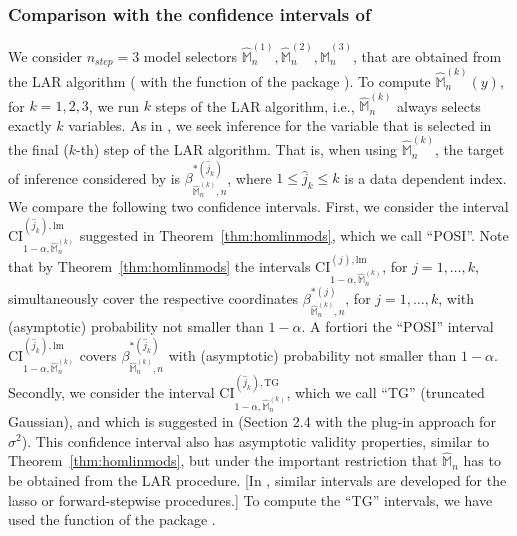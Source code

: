 \documentclass[preprint]{imsart}
\newcommand{\M}{\mathbb M}
\numberwithin{equation}{section}
\begin{document}
\subsubsection{Comparison with the confidence intervals of \cite{Tib15a}}

We consider $n_{step} = 3$ model selectors $\hat{\mathbb{M}}_n^{(1)},\hat{\mathbb{M}}_n^{(2)},\hat{\mathbb{M}}_n^{(3)}$, that are obtained from the LAR algorithm (\cite{efron04least} with the function \verb@lar@ of the \verb@R@ package \verb@lars@). To compute $\hat{\M}_n^{(k)}(y)$, for $k=1,2,3$, we run $k$ steps of the LAR algorithm, i.e., $\hat{\M}_n^{(k)}$ always selects exactly $k$ variables. As in \cite{Tib15a}, we seek inference for the variable that is selected in the final ($k$-th) step of the LAR algorithm. That is, when using $\hat{\M}_n^{(k)}$, the target of inference considered by \cite{Tib15a} is $\beta_{\hat{\mathbb{M}}_n^{(k)},n}^{* (\hat{j}_k)}$, where $1\le\hat{j}_k\le k$ is a data dependent index. 
We compare the following two confidence intervals. First, we consider  the interval $\mathrm{CI}_{1-\alpha, \hat{\mathbb{M}}_n^{(k)}}^{(\hat{j}_k), \mathrm{lm}}$ suggested in Theorem~\ref{thm:homlinmods}, which we call ``POSI''. Note that by Theorem~\ref{thm:homlinmods} the intervals $\mathrm{CI}_{1-\alpha, \hat{\mathbb{M}}_n^{(k)}}^{(j), \mathrm{lm}}$, for $j=1,\dots, k$, simultaneously cover the respective coordinates $\beta_{\hat{\mathbb{M}}_n^{(k)},n}^{* (j)}$, for $j=1,\dots, k$, with (asymptotic) probability not smaller than $1-\alpha$. A fortiori the ``POSI'' interval  $\mathrm{CI}_{1-\alpha, \hat{\mathbb{M}}_n^{(k)}}^{(\hat{j}_k), \mathrm{lm}}$ covers $\beta_{\hat{\mathbb{M}}_n^{(k)},n}^{* (\hat{j}_k)}$ with (asymptotic) probability not smaller than $1-\alpha$.
Secondly, we consider the interval $\mathrm{CI}_{1-\alpha, \hat{\mathbb{M}}_n^{(k)}}^{(\hat{j}_k), \mathrm{TG}}$, which we call ``TG'' (truncated Gaussian), and which is suggested in \cite{Tib15a} (Section 2.4 with the plug-in approach for $\sigma^2$). This confidence interval also has asymptotic validity properties, similar to Theorem~\ref{thm:homlinmods}, but under the important restriction that $\hat{\mathbb{M}}_n$ has to be obtained from the LAR procedure. [In \cite{Tib15a}, similar intervals are developed for the lasso or forward-stepwise procedures.] To compute the ``TG'' intervals, we have used the function \verb@larInf@ of the \verb@R@ package \verb@selectiveInference@.
\end{document}
